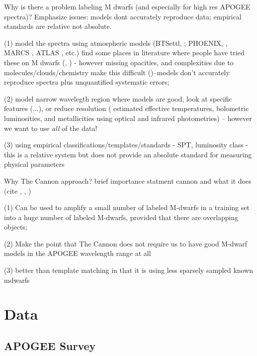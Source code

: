 \documentclass[modern]{aastex62}
\begin{document}
Why is there a problem labeling M dwarfs (and especially for high res APOGEE spectra)? Emphasize issues: models dont accurately reproduce data; empirical standards are relative not absolute. 

 (1) model the spectra using atmospheric models (BTSettl, \citealt{Allard:2011}; PHOENIX, \citealt{Husser:2013}, MARCS \citealt{Gustafsson:2008}, ATLAS \citealt{Castelli:2004}, etc.) find some places in literature where people have tried these on M dwarfs (\citealt{Rajpurohit:2014}, \citealt{Rajpurohit:2018}) - however missing opacities, and complexities due to molecules/clouds/chemistry make this difficult (\citealt{Allard:2013})--models don't accurately reproduce spectra plus unquantified systematic errors; 

 (2) model narrow wavelegth region where models are good, look at specific features (\citealt{Rojas-Ayala:2012}...), or reduce resolution (\citealt{Casagrande:2008} estimated effective temperatures, bolometric luminosities, and metallicities using optical and infrared photometries) -- however we want to use \emph{all} of the data!

 (3) using empirical classifications/templates/standards - SPT, luminosity class - this is a relative system but does not provide an absolute standard for measuring physical parameters

Why The Cannon approach? brief importance statment cannon and what it does (cite \citealt{Ness:2015}, \citealt{Ho:2017a}, \citealt{Casey:2016})

 (1) Can be used to amplify a small number of labeled M-dwarfs in a training set into a huge number of labeled M-dwarfs, provided that there are overlapping objects; 

 (2) Make the point that The Cannon does not require us to have good M-dwarf models in the APOGEE wavelength range at all 

 (3) better than template matching in that it is using less sparsely sampled known mdwarfs




\section{Data} \label{sec:data}

\subsection{APOGEE Survey}
\end{document}
